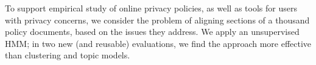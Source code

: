 To support empirical study of online privacy policies, as well as tools for users with privacy concerns, we consider the problem of aligning sections of a thousand policy documents, based on the issues they address. We apply an unsupervised HMM; in two new (and reusable) evaluations, we find the approach more effective than clustering and topic models.
